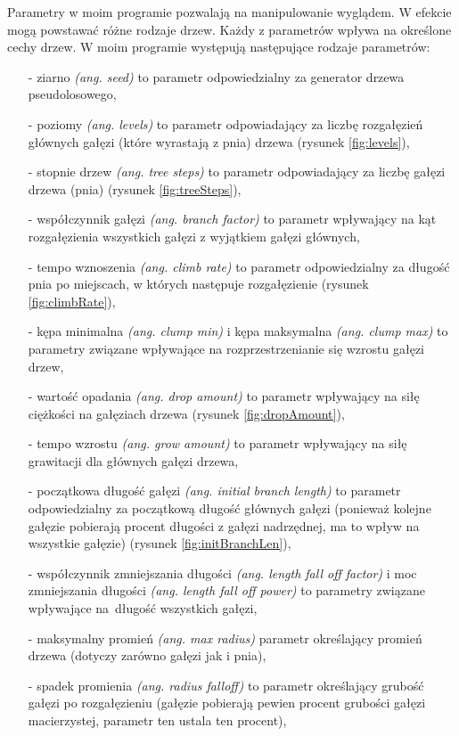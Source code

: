 \documentclass[a4paper,twoside,12pt]{report}
\begin{document}
Parametry w moim programie pozwalają na manipulowanie wyglądem. 
W efekcie mogą powstawać różne rodzaje drzew. 
Każdy z parametrów wpływa na określone cechy drzew. 
W moim programie występują następujące rodzaje parametrów:

\begin{itemize}
\setlength\itemsep{1em}
	\item[-] ziarno \textit{(ang. seed)} to parametr odpowiedzialny za generator drzewa pseudolosowego,
	\item[-] poziomy \textit{(ang. levels)} to parametr odpowiadający za liczbę rozgałęzień głównych gałęzi (które wyrastają z pnia) drzewa (rysunek \ref{fig:levels}),
	\item[-] stopnie drzew \textit{(ang. tree steps)} to parametr odpowiadający za liczbę gałęzi drzewa (pnia) (rysunek \ref{fig:treeSteps}),
	\item[-] współczynnik gałęzi \textit{(ang. branch factor)} to parametr wpływający na kąt rozgałęzienia wszystkich gałęzi z wyjątkiem gałęzi głównych,
	\item[-] tempo wznoszenia \textit{(ang. climb rate)} to parametr odpowiedzialny za długość pnia po miejscach, w których następuje rozgałęzienie (rysunek \ref{fig:climbRate}),
	\item[-] kępa minimalna \textit{(ang. clump min)} i kępa maksymalna \textit{(ang. clump max)} to parametry związane wpływające na rozprzestrzenianie się wzrostu gałęzi drzew,
	\item[-] wartość opadania \textit{(ang. drop amount)} to parametr wpływający na siłę ciężkości na gałęziach drzewa (rysunek \ref{fig:dropAmount}),
	\item[-] tempo wzrostu \textit{(ang. grow amount)} to parametr wpływający na siłę grawitacji dla głównych gałęzi drzewa,
	\item[-] początkowa długość gałęzi \textit{(ang. initial branch length)} to parametr odpowiedzialny za początkową długość głównych gałęzi (ponieważ kolejne gałęzie pobierają procent długości z gałęzi nadrzędnej, ma to wpływ na wszystkie gałęzie) (rysunek \ref{fig:initBranchLen}),
	\item[-] współczynnik zmniejszania długości \textit{(ang. length fall off factor)} i moc zmniejszania długości \textit{(ang. length fall off power)} to parametry związane wpływające na~długość wszystkich gałęzi,
	\item[-] maksymalny promień \textit{(ang. max radius)} parametr określający promień drzewa (dotyczy zarówno gałęzi jak i pnia),
	\item[-] spadek promienia \textit{(ang. radius falloff)} to parametr określający grubość gałęzi po rozgałęzieniu (gałęzie pobierają pewien procent grubości gałęzi macierzystej, parametr ten ustala ten procent),

\end{itemize}
\end{document}
